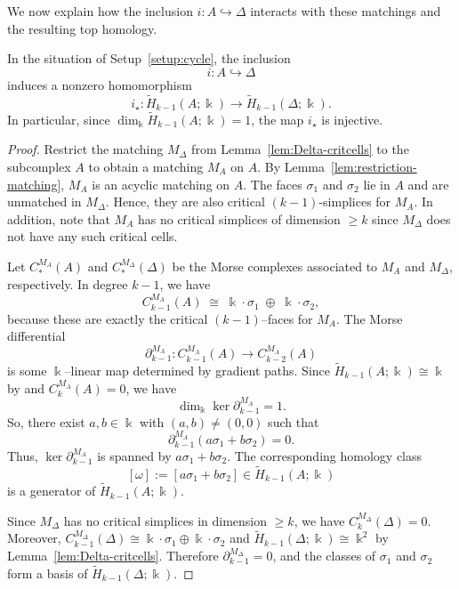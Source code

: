 \documentclass[12pt]{amsart}
\theoremstyle{plain}
\theoremstyle{definition}
\begin{document}
We now explain how the inclusion $i\colon A\hookrightarrow\Delta$ interacts with these matchings and the resulting top homology.

\begin{prop}
\label{prop:inclusion-nonzero}
In the situation of Setup~\ref{setup:cycle}, the inclusion
\[
  i\colon A\hookrightarrow\Delta
\]
induces a nonzero homomorphism
\[
  i_{\star}: \widetilde H_{k-1}(A;\Bbbk) \longrightarrow \widetilde H_{k-1}(\Delta;\Bbbk).
\]
In particular, since $\dim_\Bbbk \widetilde H_{k-1}(A;\Bbbk)=1$, the map $i_{\star}$ is injective.
\end{prop}

\begin{proof}
Restrict the matching $M_\Delta$ from Lemma~\ref{lem:Delta-critcells} to the subcomplex $A$ to obtain a matching $M_A$ on $A$. By Lemma~\ref{lem:restriction-matching}, $M_A$ is an acyclic matching on $A$. The faces $\sigma_1$ and $\sigma_2$ lie in $A$ and are unmatched in $M_\Delta$. Hence, they are also critical $(k-1)$-simplices for $M_A$. In addition, note that $M_A$ has no critical simplices of dimension $\geq k$ since $M_{\Delta}$ does not have any such critical cells.

Let $C^{M_A}_\ast(A)$ and $C^{M_\Delta}_\ast(\Delta)$ be the Morse complexes associated to $M_A$ and $M_\Delta$, respectively. In degree $k-1$, we have
\[
  C^{M_A}_{k-1}(A) \;\cong\; \Bbbk\cdot\sigma_1 \;\oplus\; \Bbbk\cdot\sigma_2,
\]
because these are exactly the critical $(k-1)$--faces for $M_A$. The Morse differential
\[
  \partial_{k-1}^{M_A}\colon C^{M_A}_{k-1}(A) \longrightarrow C^{M_A}_{k-2}(A)
\]
is some $\Bbbk$--linear map determined by gradient paths. Since $\widetilde H_{k-1}(A;\Bbbk)\cong \Bbbk$ by  and $C^{M_A}_{k}(A)=0$, we have
\[
  \dim_\Bbbk \ker \partial_{k-1}^{M_A} = 1.
\]
So, there exist $a,b\in\Bbbk$ with $(a,b)\neq (0,0)$ such that
\[
  \partial_{k-1}^{M_A}(a\sigma_1 + b\sigma_2) = 0.
\]
Thus, $\ker \partial_{k-1}^{M_A}$ is spanned by $a\sigma_1 + b\sigma_2$. The corresponding homology class
\[
  [\omega] := [ a\sigma_1 + b\sigma_2 ] \in \widetilde H_{k-1}(A;\Bbbk)
\]
is a generator of $\widetilde H_{k-1}(A;\Bbbk)$.


Since $M_\Delta$ has no critical simplices in dimension $\ge k$, we have
$C^{M_\Delta}_{k}( \Delta)=0$. Moreover,
$C^{M_\Delta}_{k-1}(\Delta)\cong \Bbbk\cdot\sigma_1\oplus \Bbbk\cdot\sigma_2$
and $\widetilde H_{k-1}(\Delta;\Bbbk)\cong \Bbbk^2$ by Lemma~\ref{lem:Delta-critcells}.
Therefore $\partial^{M_\Delta}_{k-1}=0$, and the classes of $\sigma_1$ and $\sigma_2$
form a basis of $\widetilde H_{k-1}(\Delta;\Bbbk)$.




\end{proof}
\end{document}
